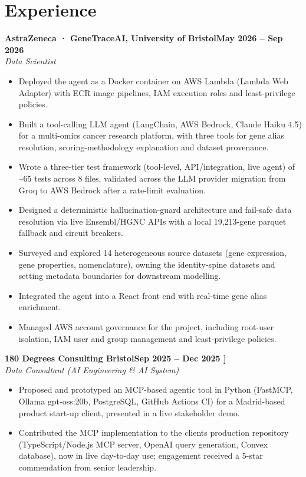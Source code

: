 \documentclass[a4paper,11pt]{article}
\newcommand{\entry}[4]{\needspace{4\baselineskip}\noindent\textbf{#1}\hfill\textbf{#2}\\ \textit{#3}\hfill\textit{#4}\par}
\begin{document}
\section{Experience}
\entry{AstraZeneca · GeneTraceAI, University of Bristol}{May 2026 – Sep 2026}{Data Scientist}{}
\begin{itemize}
  \item Deployed the agent as a Docker container on AWS Lambda (Lambda Web Adapter) with ECR image pipelines, IAM execution roles and least-privilege policies.
  \item Built a tool-calling LLM agent (LangChain, AWS Bedrock, Claude Haiku 4.5) for a multi-omics cancer research platform, with three tools for gene alias resolution, scoring-methodology explanation and dataset provenance.
  \item Wrote a three-tier test framework (tool-level, API/integration, live agent) of \textasciitilde{}65 tests across 8 files, validated across the LLM provider migration from Groq to AWS Bedrock after a rate-limit evaluation.
  \item Designed a deterministic hallucination-guard architecture and fail-safe data resolution via live Ensembl/HGNC APIs with a local 19,213-gene parquet fallback and circuit breakers.
  \item Surveyed and explored 14 heterogeneous source datasets (gene expression, gene properties, nomenclature), owning the identity-spine datasets and setting metadata boundaries for downstream modelling.
  \item Integrated the agent into a React front end with real-time gene alias enrichment.
  \item Managed AWS account governance for the project, including root-user isolation, IAM user and group management and least-privilege policies.
\end{itemize}
\vspace{4pt}
\entry{180 Degrees Consulting Bristol}{Sep 2025 – Dec 2025   ]}{Data Consultant (AI Engineering \& AI System)}{}
\begin{itemize}
  \item Proposed and prototyped an MCP-based agentic tool in Python (FastMCP, Ollama gpt-oss:20b, PostgreSQL, GitHub Actions CI) for a Madrid-based product start-up client, presented in a live stakeholder demo.
  \item Contributed the MCP implementation to the client\textquotesingle{}s production repository (TypeScript/Node.js MCP server, OpenAI query generation, Convex database), now in live day-to-day use; engagement received a 5-star commendation from senior leadership.
\end{itemize}
\end{document}
